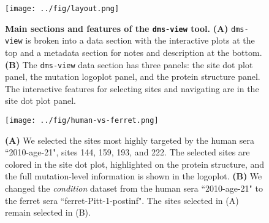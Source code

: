 
\newpage
\begin{figure}[h!]
\centerline{\texttt{[image: ../fig/layout.png]}}
\caption[\texttt{dms-view} layout]{
\label{fig:layout}
\textbf{Main sections and features of the \texttt{dms-view} tool.}
{\bf (A)} \texttt{dms-view} is broken into a data section with the interactive plots at the top and a metadata section for notes and description at the bottom.
{\bf (B)} The \texttt{dms-view} data section has three panels: the site dot plot panel, the mutation logoplot panel, and the protein structure panel.
The interactive features for selecting sites and navigating are in the site dot plot panel.
}
\end{figure}

\newpage
\begin{figure}[h!]
\centerline{\texttt{[image: ../fig/human-vs-ferret.png]}}
\caption[Comparing sites targeted by human sera to sites targeted by ferret sera.]{
\label{fig:human-vs-ferret}
{\bf (A)} We selected the sites most highly targeted by the human sera ``2010-age-21", sites 144, 159, 193, and 222. The selected sites are colored in the site dot plot, highlighted on the protein structure, and the full mutation-level information is shown in the logoplot.
{\bf (B)} We changed the \textit{condition} dataset from the human sera ``2010-age-21" to the ferret sera ``ferret-Pitt-1-postinf".
The sites selected in (A) remain selected in (B).
}
\end{figure}
